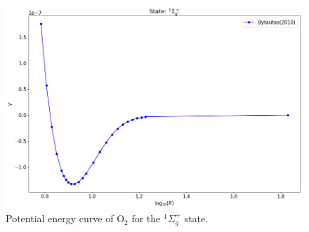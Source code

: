 \documentclass[12pt]{article}
\begin{document}
\begin{figure}[h]
    \centering
    \includegraphics[scale=0.5]{img/O2_1sigmagplus_Bytautas(2010).png}
    \caption{Potential energy curve of O$_2$ for the $^1\Sigma^+_g$ state.}
    \label{fig:o23}
\end{figure}
\fi %
\end{document}
